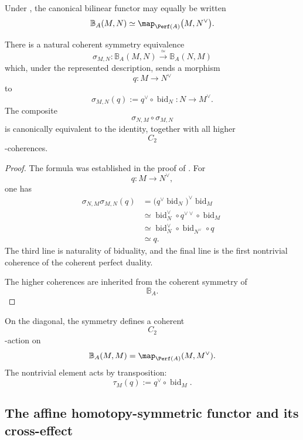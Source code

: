 Under
,
the canonical bilinear functor may equally be written
\[
    \mathbb B_A(M,N)
    \simeq
    \map_{\Perf(A)}
    \bigl(
        M,
        N^\vee
    \bigr).
\]

\begin{proposition}
\label{prop:bilinear-mapping-spectrum-symmetry}
There is a natural coherent symmetry equivalence
\[
    \sigma_{M,N}
    \colon
    \mathbb B_A(M,N)
    \xrightarrow{\;\simeq\;}
    \mathbb B_A(N,M)
\]
which, under the represented description, sends a morphism
\[
    q
    \colon
    M
    \longrightarrow
    N^\vee
\]
to
\[
    \sigma_{M,N}(q)
    :=
    q^\vee
    \circ
    \operatorname{bid}_N
    \colon
    N
    \longrightarrow
    M^\vee.
\]
The composite
\[
    \sigma_{N,M}
    \circ
    \sigma_{M,N}
\]
is canonically equivalent to the identity, together with all higher
\[
    C_2
\]
-coherences.
\end{proposition}

\begin{proof}
The formula was established in the proof of
.
For
\[
    q
    \colon
    M
    \longrightarrow
    N^\vee,
\]
one has
\[
\begin{aligned}
    \sigma_{N,M}
    \sigma_{M,N}(q)
    &=
    \bigl(
        q^\vee
        \operatorname{bid}_N
    \bigr)^\vee
    \operatorname{bid}_M
    \\
    &\simeq
    \operatorname{bid}_N^\vee
    \circ
    q^{\vee\vee}
    \circ
    \operatorname{bid}_M
    \\
    &\simeq
    \operatorname{bid}_N^\vee
    \circ
    \operatorname{bid}_{N^\vee}
    \circ
    q
    \\
    &\simeq
    q.
\end{aligned}
\]
The third line is naturality of biduality, and the final line is the first
nontrivial coherence of the coherent perfect duality.

The higher coherences are inherited from the coherent symmetry of
\[
    \mathbb B_A.
\]
\end{proof}

On the diagonal, the symmetry defines a coherent
\[
    C_2
\]
-action on
\[
    \mathbb B_A(M,M)
    =
    \map_{\Perf(A)}(M,M^\vee).
\]
The nontrivial element acts by transposition:
\[
    \tau_M(q)
    :=
    q^\vee
    \circ
    \operatorname{bid}_M.
\]


\subsection{The affine homotopy-symmetric functor and its cross-effect}

